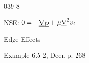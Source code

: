 \begin{mitframe}{039-8}


\begin{listone}

\item NSE: $0=-\uline{\gradop}\uline{\dynpress}+\chempot\gradop^2\vvel_{\state}$

			\begin{listtwo}
            
            \item Edge Effects
            
            \item Example 6.5-2, Deen p. 268

\end{listtwo}
\end{listone}
\end{mitframe}